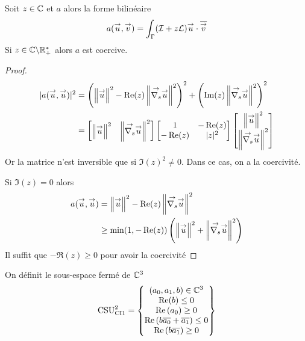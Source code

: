     \begin{lemme}
      Soit \(z\in \CC\) et \(a\) alors la forme bilinéaire
      \begin{equation*}
        a(\vect{u},\vect{v}) = \int_\Gamma(\oI + z\LL)\vect{u}\cdot\conj{\vect{v}}
      \end{equation*}
      Si \(z\in \CC\backslash \RR_+^*\) alors \(a\) est coercive.
    \end{lemme}
    \begin{proof}
      \begin{align*}
        |a(\vect{u},\vect{u})|^2 &= \left(\norm{\vu}^2-\Re(z)\norm{\vgrads{\vu}}^2\right)^2 + \left(\Im(z)\norm{\vgrads{\vu}}^2\right)^2
        \\
        &= \begin{bmatrix}
          \norm{\vu}^2
          &
          \norm{\vgrads{\vu}}^2
        \end{bmatrix}
        \begin{bmatrix}
          1 & - \Re(z)
          \\
          -\Re(z) & |z|^2
        \end{bmatrix}
        \begin{bmatrix}
          \norm{\vu}^2
          \\
          \norm{\vgrads{\vu}}^2
        \end{bmatrix}
        \\
      \end{align*}
      Or la matrice n'est inversible que si \(\Im(z)^2\not=0\). Dans ce cas, on a la coercivité.

      Si \(\Im(z)=0\) alors
      \begin{align*}
        a(\vect{u},\vect{u}) &= \norm{\vu}^2-\Re(z)\norm{\vgrads{\vu}}^2
        \\
        &\ge \min(1,-\Re(z))\left(\norm{\vu}^2+\norm{\vgrads{\vu}}^2\right)
      \end{align*}
      Il suffit que \(-\Re(z) \ge 0 \) pour avoir la coercivité
    \end{proof}

    \begin{defn}
      \label{def:csu:ci1-2}

      On définit le sous-espace fermé de \(\CC^3\)
      \begin{equation*}
        \CSU[2]{CI1} = \left\lbrace 
        \begin{matrix}
        (a_0,a_1,b) \in \CC^3
        \\
        \Re(b) \le 0
        \\
        \Re\left(a_0\right) \ge 0
        \\
        \Re\left(b\conj{a_0}+\conj{a_1}\right) \le 0
        \\
        \Re\left(b\conj{a_1}\right) \ge 0
        \end{matrix}
        \right\rbrace
      \end{equation*}
    \end{defn}

